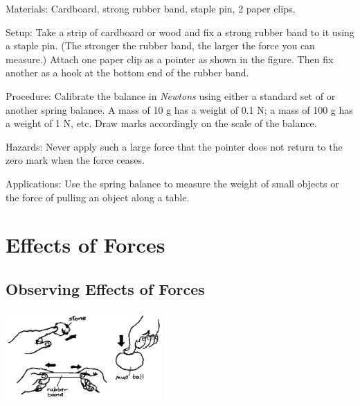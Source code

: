 \begin{multicols}{2}
\begin{description*}
\item[Materials:]{Cardboard, strong rubber band, staple pin, 2 paper clips, }
\item[Setup:]{Take a strip of cardboard or wood and fix a strong rubber band to it using a staple pin. (The stronger the rubber band, the larger the force you can measure.) Attach one paper clip as a pointer as shown in the figure. Then fix another as a hook at the bottom end of the rubber band.}
\item[Procedure:]{Calibrate the balance in \emph{Newtons} using either a standard set of  or another spring balance. A mass of 10 g has a weight of 0.1 N; a mass of 100 g has a weight of 1 N, etc. Draw marks accordingly on the scale of the balance.}
\item[Hazards:]{Never apply such a large force that the pointer does not return to the zero mark when the force ceases.}
\item[Applications:]{Use the spring balance to measure the weight of small objects or the force of pulling an object along a table.}
\end{description*}


\section*{Effects of Forces}


\subsection{Observing Effects of Forces}

\begin{center}
\includegraphics[width=0.45\textwidth]{./img/source/effects-forces.png}
\end{center}


\end{multicols}
